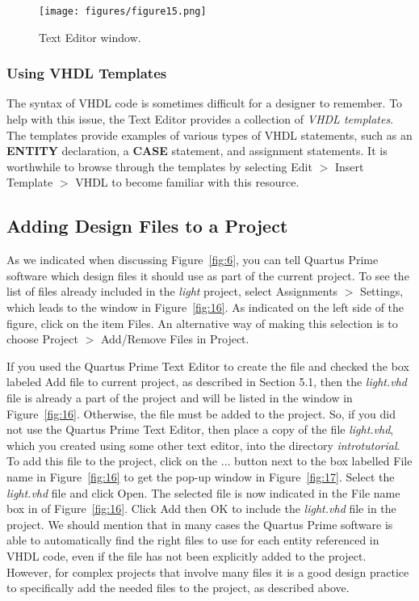 \begin{figure}[H]
   \begin{center}
      \texttt{[image: figures/figure15.png]}
   \caption{Text Editor window.} 
	 \label{fig:15}
	 \end{center}
\end{figure}

\subsubsection{Using VHDL Templates}

The syntax of VHDL code is sometimes difficult for a
designer to remember. To help with this issue, the Text Editor
provides a collection of {\it VHDL templates}. The templates provide
examples of various types of VHDL statements, such as an {\bf ENTITY}
declaration, a {\bf CASE} statement, and assignment statements. 
It is worthwhile to browse through the templates
by selecting {\sf Edit $>$ Insert Template $>$ VHDL} to become 
familiar with this resource.

\subsection{Adding Design Files to a Project}

As we indicated when discussing Figure~\ref{fig:6}, you can tell Quartus Prime software
which design files it should use as part of the current project.
To see the list of files already included in the {\it light} project,
select {\sf Assignments $>$ Settings}, which leads to the window in Figure~\ref{fig:16}.
As indicated on the left side of the figure, click on the item {\sf Files}.
An alternative way of making this selection is to choose
{\sf Project $>$ Add/Remove Files in Project}.

If you used the Quartus Prime Text Editor to create the file and checked
the box labeled {\sf Add file to current project},
as described in Section 5.1, then the {\it light.vhd}
file is already a part of the project and will be listed in
the window in Figure~\ref{fig:16}.
Otherwise, the file must be added to the project. 
So, if you did not use the Quartus Prime Text Editor, then place a copy of the 
file {\it light.vhd}, which you created using some other text editor, into 
the directory {\it introtutorial}.
To add this file to the project, click on the {\sf ...} button next to the 
box labelled {\sf File name} in
Figure~\ref{fig:16} to get the pop-up window in Figure~\ref{fig:17}.
Select the {\it light.vhd} file and click {\sf Open}.
The selected file is now indicated in the {\sf File name} box in of Figure~\ref{fig:16}. 
Click {\sf Add} then {\sf OK} to include the {\it light.vhd} file in the project.
We should mention that in many cases the Quartus Prime software is able to 
automatically find the right files to use for each entity 
referenced in VHDL code, even if the file has not been 
explicitly added to the project. However, for complex projects that
involve many files it is a good design practice to specifically
add the needed files to the project, as described above.

